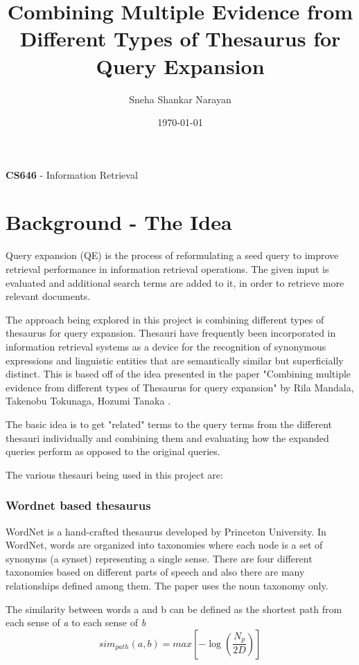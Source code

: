 \documentclass[a4paper, 12pt, notitlepage]{report}
\title{Combining Multiple Evidence from Different Types of Thesaurus for Query Expansion}
\author{Sneha Shankar Narayan}
\date{\today}
\begin{document}
\maketitle
\begin{center}
\Large{
\textbf{CS646} - Information Retrieval}
\end{center}
\newpage

\tableofcontents

\chapter{Background - The Idea}
Query expansion (QE) is the process of reformulating a seed query to improve retrieval performance in information retrieval operations. \cite{wiki} The given input is evaluated and additional search terms are added to it, in order to retrieve more relevant documents.

The approach being explored in this project is combining different types of thesaurus for query expansion. Thesauri
have frequently been incorporated in information retrieval systems as a device for the recognition of synonymous expressions and linguistic entities that are semantically similar but superficially distinct. \cite{paper}
This is based off of the idea presented in the paper "Combining multiple evidence from different types of Thesaurus for query expansion" by Rila Mandala, Takenobu Tokunaga, Hozumi Tanaka \cite{paper}. 

The basic idea is to get "related" terms to the query terms from the different thesauri individually and combining them and evaluating how the expanded queries perform as opposed to the original queries.

The various thesauri being used in this project are:
\subsection*{Wordnet based thesaurus}
WordNet is a hand-crafted thesaurus developed by Princeton University. In WordNet, words are organized into taxonomies where each node is a set of synonyms (a synset) representing a single sense. There are four different taxonomies based on different parts of speech and also there are many relationships defined among
them. \cite{paper} The paper uses the noun taxonomy only.

The similarity between words a and b can be defined as the shortest path from each sense of \textit{a} to each sense of \textit{b}
\begin{equation*}
sim_{path}(a, b) = max[-\log(\frac{N_p}{2D})]
\end{equation*}
\end{document}
